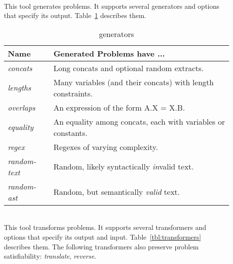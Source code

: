     \begin{description}

        \item[\generator{}] \hfill \\
            This tool generates \smt{} problems. It supports several generators and options that specify its output. Table~\ref{tbl:generators} describes them.
            \hfill \\

            \begin{table}
                \centering
                \begin{tabular}{|l|l|}
                    \hline
                    \textbf{Name}        & \textbf{Generated Problems have ...} \\ \hline
                    \textit{concats}     & Long concats and optional random extracts. \\ \hline
                    \textit{lengths}     & Many variables (and their concats) with length constraints. \\ \hline
                    \textit{overlaps}    & An expression of the form A.X = X.B. \\ \hline
                    \textit{equality}    & An equality among concats, each with variables or constants. \\ \hline
                    \textit{regex}       & Regexes of varying complexity. \\ \hline
                    \textit{random-text} & Random, likely syntactically \textit{in}valid text. \\ \hline
                    \textit{random-ast}  & Random, but semantically \textit{valid} text. \\ \hline
                \end{tabular}
                \caption{\generator{} generators}
                \label{tbl:generators}
            \end{table}

        \item[\transformer{}] \hfill \\
            This tool transforms \smt{} problems. It supports several transformers and options that specify its output and input. Table~\ref{tbl:transformers} describes them. The following transformers also preserve problem satisfiability: \textit{translate}, \textit{reverse}. \cite{ifaz}
            \hfill \\


\end{description}
